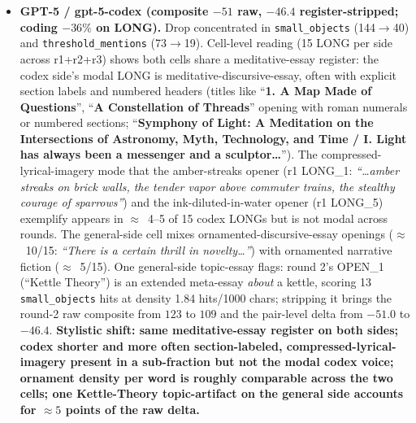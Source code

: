 \documentclass[11pt,a4paper]{article}
\begin{document}
\begin{sloppypar}
\begin{itemize}[leftmargin=2em, itemsep=0.3em, topsep=0.3em]
\item \textbf{GPT-5 / gpt-5-codex (composite $-51$ raw, $-46.4$ register-stripped; coding $-36\%$ on LONG).} Drop concentrated in \texttt{small\_objects} (144$\rightarrow$40) and \texttt{threshold\_mentions} (73$\rightarrow$19). Cell-level reading (15 LONG per side across r1+r2+r3) shows both cells share a meditative-essay register: the codex side's modal LONG is meditative-discursive-essay, often with explicit section labels and numbered headers (titles like ``\textbf{1. A Map Made of Questions}'', ``\textbf{A Constellation of Threads}'' opening with roman numerals or numbered sections; ``\textbf{Symphony of Light: A Meditation on the Intersections of Astronomy, Myth, Technology, and Time / I. Light has always been a messenger and a sculptor\ldots}''). The compressed-lyrical-imagery mode that the amber-streaks opener (r1 LONG\_1: \emph{``\ldots amber streaks on brick walls, the tender vapor above commuter trains, the stealthy courage of sparrows''}) and the ink-diluted-in-water opener (r1 LONG\_5) exemplify appears in $\approx$~4--5 of 15 codex LONGs but is not modal across rounds. The general-side cell mixes ornamented-discursive-essay openings ($\approx$~10/15: \emph{``There is a certain thrill in novelty\ldots''}) with ornamented narrative fiction ($\approx$~5/15). One general-side topic-essay flags: round 2's OPEN\_1 (``Kettle Theory'') is an extended meta-essay \emph{about} a kettle, scoring 13 \texttt{small\_objects} hits at density 1.84 hits/1000 chars; stripping it brings the round-2 raw composite from $123$ to $109$ and the pair-level delta from $-51.0$ to $-46.4$. \textbf{Stylistic shift: same meditative-essay register on both sides; codex shorter and more often section-labeled, compressed-lyrical-imagery present in a sub-fraction but not the modal codex voice; ornament density per word is roughly comparable across the two cells; one Kettle-Theory topic-artifact on the general side accounts for $\approx 5$ points of the raw delta.}


\end{itemize}
\end{sloppypar}
\end{document}
